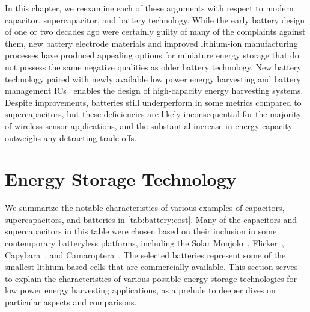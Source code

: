 In this chapter, we reexamine each of these arguments with respect to modern capacitor, supercapacitor, and battery technology. 
While the early battery design of one or two decades ago were certainly guilty of many of the complaints against them, new 
battery electrode materials and improved lithium-ion manufacturing processes have produced appealing options for miniature energy storage 
that do not possess the same negative qualities as older battery technology. 
New battery technology paired with newly available low power energy harvesting and battery management ICs~\cite{bq25505,adp5091} enables the design of high-capacity energy harvesting systems.
Despite improvements, batteries still underperform in some metrics compared to supercapacitors, but these deficiencies are likely inconsequential for the majority of wireless sensor applications, and the substantial increase in energy capacity outweighs any detracting trade-offs.\\

\begin{landscape}
\end{landscape}

\section{Energy Storage Technology}
\label{sec:battery-new}

We summarize the notable characteristics of various examples of capacitors, supercapacitors, and batteries in \cref{tab:battery:cost}. Many of the capacitors and supercapacitors in this table were chosen based on their inclusion in some contemporary batteryless platforms, including the Solar Monjolo~\cite{campbellEnergy14}, Flicker~\cite{hesterFlicker17}, Capybara~\cite{colinReconfigurable18}, and Camaroptera~\cite{nardello2019camaroptera}.
The selected batteries represent some of the smallest lithium-based cells that are commercially available. 
This section serves to explain the characteristics of various possible energy storage technologies for low power energy harvesting applications, as a prelude to deeper dives on particular aspects and comparisons.

